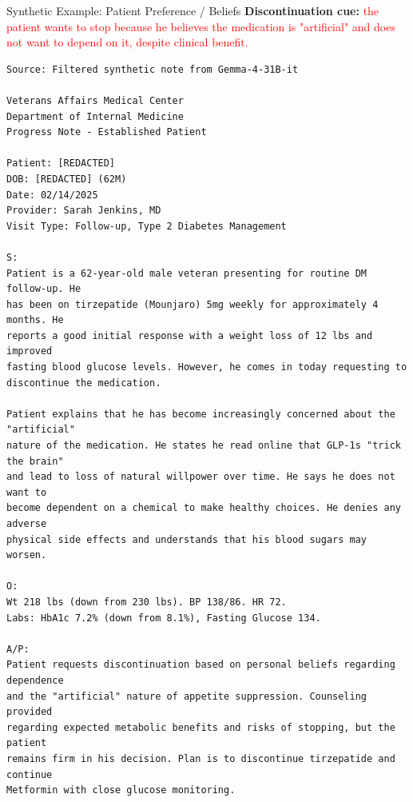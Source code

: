 \documentclass[aspectratio=169]{beamer}
\begin{document}
\begin{frame}{Synthetic Example: Patient Preference / Beliefs}
\tiny
\textbf{Discontinuation cue:}
\textcolor{red}{the patient wants to stop because he believes the medication is "artificial" and does not want to depend on it, despite clinical benefit.}

\vspace{0.5em}
\begin{verbatim}
Source: Filtered synthetic note from Gemma-4-31B-it

Veterans Affairs Medical Center
Department of Internal Medicine
Progress Note - Established Patient

Patient: [REDACTED]
DOB: [REDACTED] (62M)
Date: 02/14/2025
Provider: Sarah Jenkins, MD
Visit Type: Follow-up, Type 2 Diabetes Management

S:
Patient is a 62-year-old male veteran presenting for routine DM follow-up. He
has been on tirzepatide (Mounjaro) 5mg weekly for approximately 4 months. He
reports a good initial response with a weight loss of 12 lbs and improved
fasting blood glucose levels. However, he comes in today requesting to
discontinue the medication.

Patient explains that he has become increasingly concerned about the "artificial"
nature of the medication. He states he read online that GLP-1s "trick the brain"
and lead to loss of natural willpower over time. He says he does not want to
become dependent on a chemical to make healthy choices. He denies any adverse
physical side effects and understands that his blood sugars may worsen.

O:
Wt 218 lbs (down from 230 lbs). BP 138/86. HR 72.
Labs: HbA1c 7.2% (down from 8.1%), Fasting Glucose 134.

A/P:
Patient requests discontinuation based on personal beliefs regarding dependence
and the "artificial" nature of appetite suppression. Counseling provided
regarding expected metabolic benefits and risks of stopping, but the patient
remains firm in his decision. Plan is to discontinue tirzepatide and continue
Metformin with close glucose monitoring.
\end{verbatim}
\end{frame}
\end{document}
